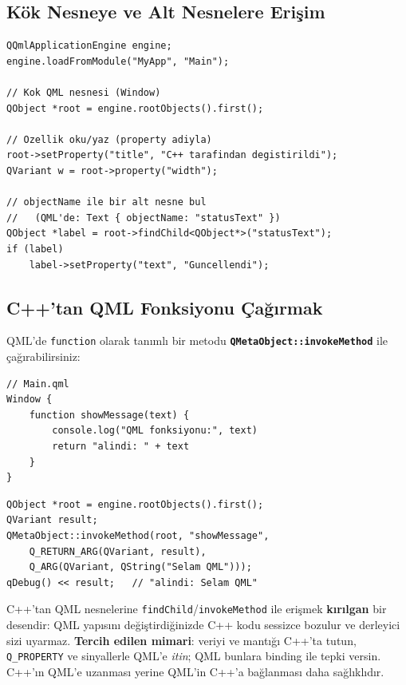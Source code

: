 \documentclass[11pt,a4paper]{article}
\newcommand{\kls}[1]{\texttt{\color{anaMavi}\textbf{#1}}}
\newcommand{\kod}[1]{\texttt{\color{koyuGri}#1}}
\begin{document}
\subsection{Kök Nesneye ve Alt Nesnelere Erişim}

\begin{lstlisting}
QQmlApplicationEngine engine;
engine.loadFromModule("MyApp", "Main");

// Kok QML nesnesi (Window)
QObject *root = engine.rootObjects().first();

// Ozellik oku/yaz (property adiyla)
root->setProperty("title", "C++ tarafindan degistirildi");
QVariant w = root->property("width");

// objectName ile bir alt nesne bul
//   (QML'de: Text { objectName: "statusText" })
QObject *label = root->findChild<QObject*>("statusText");
if (label)
    label->setProperty("text", "Guncellendi");
\end{lstlisting}

\subsection{C++'tan QML Fonksiyonu Çağırmak}

QML'de \kod{function} olarak tanımlı bir metodu \kls{QMetaObject::invokeMethod}
ile çağırabilirsiniz:

\begin{lstlisting}[style=qmlstyle]
// Main.qml
Window {
    function showMessage(text) {
        console.log("QML fonksiyonu:", text)
        return "alindi: " + text
    }
}
\end{lstlisting}

\begin{lstlisting}
QObject *root = engine.rootObjects().first();
QVariant result;
QMetaObject::invokeMethod(root, "showMessage",
    Q_RETURN_ARG(QVariant, result),
    Q_ARG(QVariant, QString("Selam QML")));
qDebug() << result;   // "alindi: Selam QML"
\end{lstlisting}

\begin{uyarikutu}
C++'tan QML nesnelerine \kod{findChild}/\kod{invokeMethod} ile erişmek
\textbf{kırılgan} bir desendir: QML yapısını değiştirdiğinizde C++ kodu sessizce
bozulur ve derleyici sizi uyarmaz. \textbf{Tercih edilen mimari}: veriyi ve
mantığı C++'ta tutun, \kod{Q\_PROPERTY} ve sinyallerle QML'e \emph{itin}; QML
bunlara binding ile tepki versin. C++'ın QML'e uzanması yerine QML'in C++'a
bağlanması daha sağlıklıdır.
\end{uyarikutu}
\end{document}
